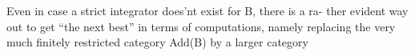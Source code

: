 Even in case a strict integrator does'nt exist for B, there is a ra-%
ther evident way out to get ``the next best'' in terms of computations,
namely replacing the very much finitely restricted category Add(B) by a
larger category


